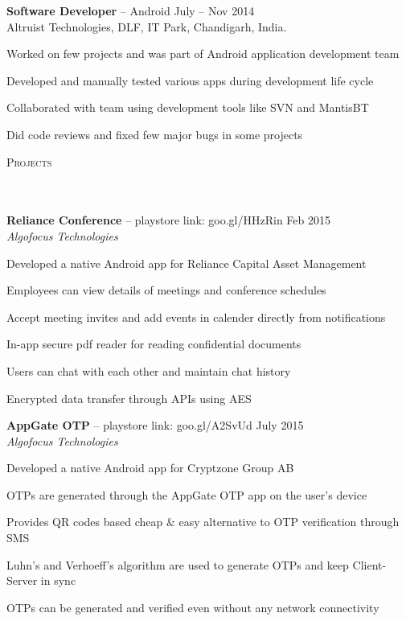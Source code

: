 \documentclass{article}
\newcommand{\header}[1]{{
\hspace*{-15pt}\vspace*{6pt} \textsc{#1}} \vspace*{-6pt} 
\lineunder
}
\newcommand{\lineunder}{
\vspace*{-8pt} \\ \hspace*{-18pt} 
\hrulefill \\
}
\newcommand{\employer}[4]{{
\vspace*{2pt}%
\textbf{#1} #2 \hfill #3\\ #4 \vspace*{2pt}}
}
\newcommand{\project}[4]{{
\vspace*{2pt}%
\textbf{#1} #2 \hfill #3\\ \textit{#4} \vspace*{2pt}}
}
\renewcommand{\labelitemii}{
$\vcenter{\hbox{\tiny$\bullet$}}$\hspace*{-3pt}
}
\newenvironment{bullet-list-minor}{
\begin{list}{\labelitemii}{\setlength\leftmargin{15pt} 
\topsep 0pt \itemsep -2pt}}{\vspace*{4pt}\end{list}
}
\begin{document}
    \employer{Software Developer}{-- Android}{July -- Nov 2014}{Altruist Technologies, DLF, IT Park, Chandigarh, India.}
	\begin{bullet-list-minor}
	\item Worked on few projects and was part of Android application development team
	\item Developed and manually tested various apps during development life cycle
	\item Collaborated with team using development tools like SVN and MantisBT
	\item Did code reviews and fixed few major bugs in some projects
	\end{bullet-list-minor}

\vspace*{4pt}%
\header{Projects}
    \project{Reliance Conference}{-- playstore link: goo.gl/HHzRin}{Feb 2015}{Algofocus Technologies}
	\begin{bullet-list-minor}
	\item Developed a native Android app for Reliance Capital Asset Management
	\item Employees can view details of meetings and conference schedules
	\item Accept meeting invites and add events in calender directly from notifications
	\item In-app secure pdf reader for reading confidential documents
    \item Users can chat with each other and maintain chat history
	\item Encrypted data transfer through APIs using AES
    \end{bullet-list-minor}

    \project{AppGate OTP}{-- playstore link: goo.gl/A2SvUd}{July 2015}{Algofocus Technologies}
	\begin{bullet-list-minor}
	\item Developed a native Android app for Cryptzone Group AB
	\item OTPs are generated through the AppGate OTP app on the user's device
	\item Provides QR codes based cheap \& easy alternative to OTP verification through SMS
    \item Luhn's and Verhoeff's algorithm are used to generate OTPs and keep Client-Server in sync
	\item OTPs can be generated and verified even without any network connectivity
    \end{bullet-list-minor}
\end{document}
